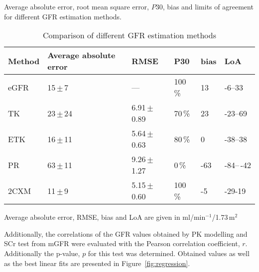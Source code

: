 \begin{table}[H]
\centering
\caption{Comparison of different GFR estimation methods}{Average absolute error, root mean square error, $P30$, bias and limits of agreement for different GFR estimation methods}. 
\label{tab:results2}
\begin{threeparttable}
\renewcommand{\arraystretch}{1.5}
\begin{tabular}{l R{2.5cm} R{2.5cm}  R{2cm} R{2cm} R{2cm}}
	\toprule

	\textbf{Method} & \textbf{Average absolute error}  & \textbf{RMSE}    & \textbf{P30}   & \textbf{bias} & \textbf{LoA} \\ \toprule
				eGFR  & 		15\,$\pm$\,7     		 	 & ---  				&	100\,\%      &  13  & -6--33 \\
				 TK   & 		23\,$\pm$\,24    			 & 6.91\,$\pm$\,0.89		        & 	70\,\%       & 23   &  -23--69 \\
				ETK   & 		16\,$\pm$\,11     			 & 5.64\,$\pm$\,0.63			        &	80\,\%       &0    & -38--38\\
				 PR   & 		63\,$\pm$\,11     			 & 9.26\,$\pm$\,1.27				        &	  0\,\%      & -63  & -84--\,-42\\
			    2CXM  & 		11\,$\pm$\,9     		     & 5.15\,$\pm$\,0.60				        &	  100\,\%      &  -5  & -29-19\\
				

  	\bottomrule

\end{tabular}
\begin{tablenotes}%
\footnotesize{}%
\item Average absolute error, RMSE, bias and LoA are given in ml/min$^{-1}$/1.73\,m$^2$
    \end{tablenotes}
	\end{threeparttable}
\end{table}


Additionally, the correlations of the GFR values obtained by PK modelling and SCr test from mGFR were evaluated with the Pearson correlation coefficient, $r$. Additionally the p-value, $p$ for this test was determined. Obtained values as well as the best linear fits are presented in Figure~\ref{fig:regression}.  
\newpage

